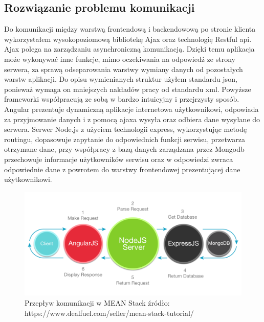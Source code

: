\documentclass[12pt]{report}
\begin{document}
\subsection{Rozwiązanie problemu komunikacji}
Do komunikacji między warstwą frontendową i backendowową po stronie klienta wykorzystałem wysokopoziomową bibliotekę Ajax oraz technologię Restful api. 
Ajax polega na zarządzaniu asynchroniczną komunikacją. 
Dzięki temu aplikacja może wykonywać inne funkcje, mimo oczekiwania na odpowiedź ze strony serwera, za sprawą odseparowania warstwy wymiany danych od pozostałych warstw aplikacji.
Do opisu wymienianych struktur użyłem standardu json, ponieważ wymaga on mniejszych nakładów pracy od standardu xml. 
Powyższe frameworki współpracują ze sobą w bardzo intuicyjny i przejrzysty sposób. 
Angular prezentuje dynamiczną aplikacje internetowa użytkownikowi, odpowiada za przyjmowanie danych i z pomocą ajaxa wysyła oraz odbiera dane wysyłane do serwera. 
Serwer Node.js z użyciem technologii express, wykorzystując metodę routingu, dopasowuje zapytanie do odpowiednich funkcji serwisu, przetwarza otrzymane dane, przy współpracy z bazą danych zarządzana przez Mongodb przechowuje informacje użytkowników serwisu oraz w odpowiedzi zwraca odpowiednie dane z powrotem do warstwy frontendowej prezentującej dane użytkownikowi. 
\newpage
\begin{figure}[!hb]
\centering
\includegraphics[width=\textwidth,height=\textheight,keepaspectratio]{Meanex.png}
\caption{Przepływ komunikacji w MEAN Stack źródło: https://www.dealfuel.com/seller/mean-stack-tutorial/}
\end{figure}
\end{document}
